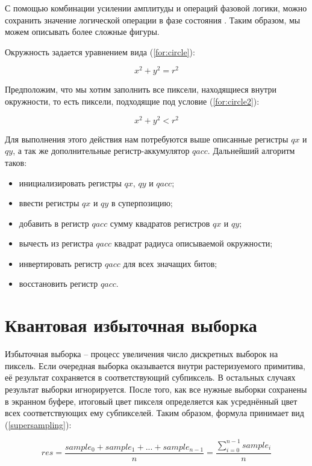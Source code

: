 С помощью комбинации усилении амплитуды и операций фазовой логики, можно сохранить значение логической операции в фазе состояния \cite{PQC}. Таким образом, мы можем описывать более сложные фигуры. 

Окружность задается уравнением вида (\ref{for:circle}):

\begin{equation}
\label{for:circle}
x^2 + y^2 = r^2
\end{equation}

Предположим, что мы хотим заполнить все пиксели, находящиеся внутри окружности, то есть пиксели, подходящие под условие (\ref{for:circle2}):

\begin{equation}
\label{for:circle2}
x^2 + y^2 < r^2
\end{equation}

Для выполнения этого действия нам потребуются выше описанные регистры $qx$ и $qy$, а так же дополнительные регистр-аккумулятор $qacc$. Дальнейший алгоритм таков:

\begin{itemize}
	\item инициализировать регистры $qx$, $qy$ и $qacc$;
	\item ввести регистры $qx$ и $qy$ в суперпозицию;
	\item добавить в регистр $qacc$ сумму квадратов регистров $qx$ и $qy$;
	\item вычесть из регистра $qacc$ квадрат радиуса описываемой окружности;
	\item инвертировать регистр $qacc$ для всех значащих битов;
	\item восстановить регистр $qacc$.
\end{itemize}

\section{Квантовая избыточная выборка}

Избыточная выборка -- процесс увеличения число дискретных выборок на пиксель. Если очередная выборка оказывается внутри растеризуемого примитива, её результат сохраняется в соответствующий субпиксель. В остальных случаях результат выборки игнорируется. После того, как все нужные выборки сохранены в экранном буфере, итоговый цвет пикселя определяется как усреднённый цвет всех соответствующих ему субпикселей. Таким образом, формула принимает вид (\ref{supersampling}): 

\begin{equation}
	\label{supersampling}
	res = \frac{sample_{0} + sample_{1} + ... + sample_{n-1}}{n} = \frac{\sum_{i=0}^{n - 1} sample_{i}}{n}
\end{equation}

